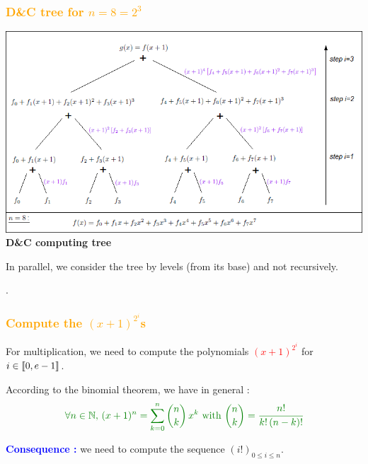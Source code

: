 
\begin{frame}[fragile]
\frametitle{\textbf{\textcolor{orange}{D{\&}C tree for $n=8=2^3$}}}

\begin{center}
\includegraphics[scale = 0.37]{ComputingTree.png}\\
\textbf{D{\&}C computing tree}
\end{center}

\begin{block}{}
In parallel, we consider the tree by levels (from its base) and not recursively.
\end{block}
.
\end{frame}


\begin{frame}[fragile]
\frametitle{\textbf{\textcolor{orange}{Compute the $(x+1)^{2^i}$s}}}

For multiplication, we need to compute the polynomials \textcolor{red}{$(x+1)^{2^i}$} for $i\in \mbox{\textlbrackdbl} 0, e-1\mbox{\textrbrackdbl}$.\\
\vspace{4mm}
\begin{cb}
According to the binomial theorem, we have in general :
$$\textcolor{darkgreen}{\forall n\in \mathbb{N},\, (x+1)^n = \sum_{k=0}^{n} {n \choose k}\, x^k \mbox{ with } {n \choose k} = \cfrac{n!}{k!\, (n-k)!}}$$
\end{cb}

\textcolor{blue}{\textbf{Consequence :}} we need to compute the sequence $(i!)_{0 \leq i \leq n}$.

\end{frame}

